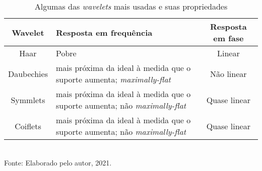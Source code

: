 \begin{table}[h]
	\centering
	\caption{Algumas das \textit{wavelets} mais usadas e suas propriedades}
	\begin{tabular}{|c|p{75mm}|c|}
			\hline 
			\textbf{Wavelet} & \textbf{Resposta em frequência} & \textbf{Resposta em fase} \\ 
			\hline 
			Haar & Pobre &  Linear \\ 
			\hline 
			Daubechies & mais próxima da ideal à medida que o \newline  suporte aumenta; \textit{maximally-flat}  &  Não linear \\ 
			\hline 
			Symmlets & mais próxima da ideal à medida que o \newline  suporte aumenta; não \textit{maximally-flat}  & Quase linear \\ 
			\hline 
			Coiflets & mais próxima da ideal à medida que o \newline  suporte aumenta; não \textit{maximally-flat}  & Quase linear \\ 
			\hline 
	\end{tabular} 
	\label{tab:waveletsProperties}
	\\Fonte: Elaborado pelo autor, 2021.
\end{table}
